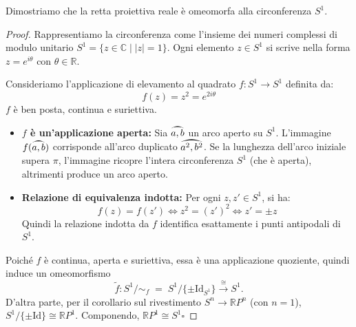 \begin{ejemplo}[Caso $n=1$: $\mathbb{R}P^1 \cong S^1$]
Dimostriamo che la retta proiettiva reale è omeomorfa alla circonferenza $S^1$.

\begin{proof}
Rappresentiamo la circonferenza come l'insieme dei numeri complessi di modulo unitario $S^1 = \{z \in \mathbb{C} \mid |z| = 1\}$. Ogni elemento $z \in S^1$ si scrive nella forma $z = e^{i\theta}$ con $\theta \in \mathbb{R}$.

Consideriamo l'applicazione di elevamento al quadrato $f: S^1 \to S^1$ definita da:
\[
f(z) = z^2 = e^{2i\theta}
\]
$f$ è ben posta, continua e suriettiva.

\begin{itemize}
    \item \textbf{$f$ è un'applicazione aperta:}
    Sia $\widearc{a,b}$ un arco aperto su $S^1$. L'immagine $f(\widearc{a,b})$ corrisponde all'arco duplicato $\widearc{a^2, b^2}$. Se la lunghezza dell'arco iniziale supera $\pi$, l'immagine ricopre l'intera circonferenza $S^1$ (che è aperta), altrimenti produce un arco aperto.

    \item \textbf{Relazione di equivalenza indotta:}
    Per ogni $z, z' \in S^1$, si ha:
    \[
    f(z) = f(z') \iff z^2 = (z')^2 \iff z' = \pm z
    \]
    Quindi la relazione indotta da $f$ identifica esattamente i punti antipodali di $S^1$.
\end{itemize}

Poich\'e $f$ \`e continua, aperta e suriettiva, essa \`e una applicazione quoziente, quindi induce un omeomorfismo
\[
\widetilde{f}: S^1 \big/ \sim_f \;=\; S^1 \big/ \{ \pm \mathrm{Id}_{S^1} \} \xrightarrow{\ \cong\ } S^1 .
\]
D'altra parte, per il corollario sul rivestimento $S^n \to \mathbb{R}P^n$ (con $n=1$), $S^1 / \{\pm \mathrm{Id}\} \cong \mathbb{R}P^1$. Componendo, $\mathbb{R}P^1 \cong S^1$\hfill$\square$
\end{proof}
\end{ejemplo}

\vspace{1.5em}

